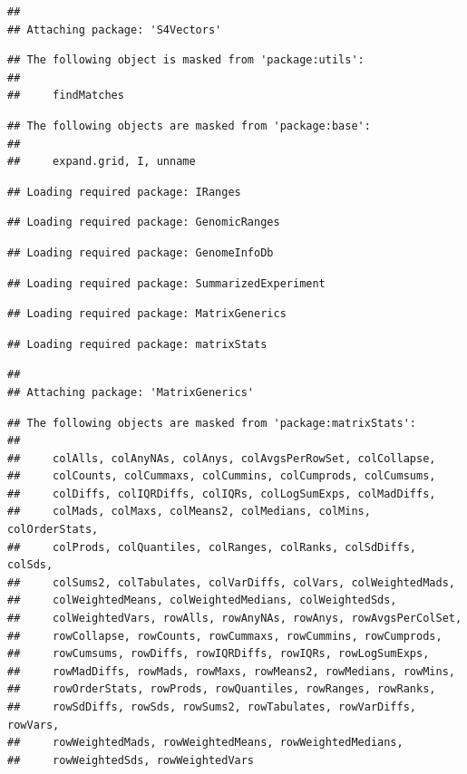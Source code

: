 \documentclass[
]{article}
\begin{document}
\begin{verbatim}
## 
## Attaching package: 'S4Vectors'
\end{verbatim}

\begin{verbatim}
## The following object is masked from 'package:utils':
## 
##     findMatches
\end{verbatim}

\begin{verbatim}
## The following objects are masked from 'package:base':
## 
##     expand.grid, I, unname
\end{verbatim}

\begin{verbatim}
## Loading required package: IRanges
\end{verbatim}

\begin{verbatim}
## Loading required package: GenomicRanges
\end{verbatim}

\begin{verbatim}
## Loading required package: GenomeInfoDb
\end{verbatim}

\begin{verbatim}
## Loading required package: SummarizedExperiment
\end{verbatim}

\begin{verbatim}
## Loading required package: MatrixGenerics
\end{verbatim}

\begin{verbatim}
## Loading required package: matrixStats
\end{verbatim}

\begin{verbatim}
## 
## Attaching package: 'MatrixGenerics'
\end{verbatim}

\begin{verbatim}
## The following objects are masked from 'package:matrixStats':
## 
##     colAlls, colAnyNAs, colAnys, colAvgsPerRowSet, colCollapse,
##     colCounts, colCummaxs, colCummins, colCumprods, colCumsums,
##     colDiffs, colIQRDiffs, colIQRs, colLogSumExps, colMadDiffs,
##     colMads, colMaxs, colMeans2, colMedians, colMins, colOrderStats,
##     colProds, colQuantiles, colRanges, colRanks, colSdDiffs, colSds,
##     colSums2, colTabulates, colVarDiffs, colVars, colWeightedMads,
##     colWeightedMeans, colWeightedMedians, colWeightedSds,
##     colWeightedVars, rowAlls, rowAnyNAs, rowAnys, rowAvgsPerColSet,
##     rowCollapse, rowCounts, rowCummaxs, rowCummins, rowCumprods,
##     rowCumsums, rowDiffs, rowIQRDiffs, rowIQRs, rowLogSumExps,
##     rowMadDiffs, rowMads, rowMaxs, rowMeans2, rowMedians, rowMins,
##     rowOrderStats, rowProds, rowQuantiles, rowRanges, rowRanks,
##     rowSdDiffs, rowSds, rowSums2, rowTabulates, rowVarDiffs, rowVars,
##     rowWeightedMads, rowWeightedMeans, rowWeightedMedians,
##     rowWeightedSds, rowWeightedVars
\end{verbatim}
\end{document}
